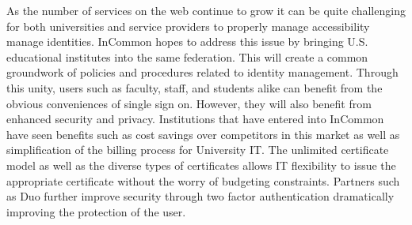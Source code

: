 \documentclass[9pt,twocolumn,twoside]{../../styles/osajnl}
\begin{document}
As the number of services on the web continue to grow it can be quite
challenging for both universities and service providers to properly
manage accessibility manage identities.  InCommon hopes to address
this issue by bringing U.S. educational institutes into the same
federation.  This will create a common groundwork of policies and
procedures related to identity management.  Through this unity, users
such as faculty, staff, and students alike can benefit from the
obvious conveniences of single sign on.  However, they will also benefit
from enhanced security and privacy.  Institutions that have entered
into InCommon have seen benefits such as cost savings over competitors
in this market as well as simplification of the billing process for
University IT.  The unlimited certificate model as well as the diverse
types of certificates allows IT flexibility to issue the appropriate
certificate without the worry of budgeting constraints.  Partners such
as Duo further improve security through two factor authentication
dramatically improving the protection of the user.




 
\end{document}
